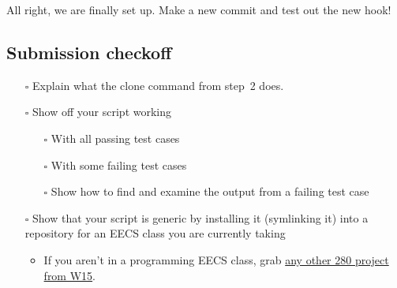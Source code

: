\documentclass{article}
\begin{document}
\medskip

\noindent
All right, we are finally set up. Make a new commit and test out the new hook!

\subsection*{Submission checkoff}
\begin{itemize}
  \item[$\square$] Explain what the clone command from step~2 does.
  \item[$\square$] Show off your script working
    \begin{itemize}
      \item[$\square$] With all passing test cases
      \item[$\square$] With some failing test cases
      \item[$\square$] Show how to find and examine the output from a failing
        test case
    \end{itemize}
  \item[$\square$] Show that your script is generic by installing it (symlinking
    it) into a repository for an EECS class you are currently taking
    \begin{itemize}
      \item If you aren't in a programming EECS class, grab
        \href{http://www.andrewdeorio.com/teaching/eecs280/}{any other 280
        project from W15}.
    \end{itemize}
\end{itemize}
\end{document}

